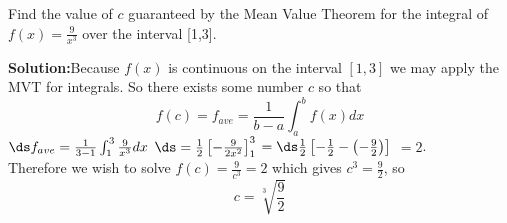 \begin{frame}

\begin{example}
{Find the value of $c$ guaranteed by the Mean Value Theorem 
for the integral of $f(x)=\frac{9}{x^3}$  over the interval [1,3].}\\

\pause 

{\bf{Solution:}}Because $f(x)$ is continuous on the interval $[1,3]$ we may apply the MVT for integrals.  
So there exists some number $c$ so that 
\[
f(c)=f_{ave}=\frac{1}{b-a}\int_a^bf(x)dx
\] 
\pause 
$\ds f_{ave}=\frac{1}{3-1}\int_1^3\frac{9}{x^3}dx$
\pause
$\ds =\frac{1}{2}\left[ -\frac{9}{2x^2}\right]_1^3$
\pause
$=\ds \frac{1}{2}\left[ -\frac12-\left(-\frac92\right)\right]$
\pause
$=2$.\\

\pause
Therefore we wish to solve $f(c)=\frac{9}{c^3}=2$  \pause which gives $c^3=\frac92$, so
\[
c=\sqrt[3]{\frac{9}{2}}
\] 




\end{example}
\end{frame}



